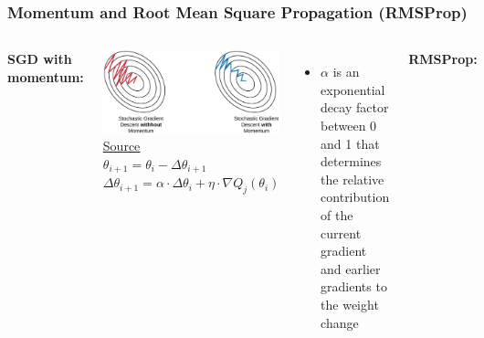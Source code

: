 \documentclass[12pt, aspectratio = 169]{beamer}
\begin{document}

\begin{frame}
	\frametitle{Momentum and Root Mean Square Propagation (RMSProp)}
	\begin{columns}[T]
	    \begin{minipage}[t]{\linewidth}
	        \centering
	        \begin{center}
	            \textbf{SGD with momentum:}
            \end{center}
	        \includegraphics[width=0.6\linewidth]{momentum.png}\\
		    \href{https://eloquentarduino.github.io/2020/04/stochastic-gradient-descent-on-your-microcontroller/}{\color{blue}\uline{Source}}\\
		    $\theta_{i+1} = \theta_i - \Delta \theta_{i+1}$\\
		    $\Delta \theta_{i+1} = \alpha \cdot \Delta \theta_i + \eta \cdot \nabla Q_j(\theta_i)$\\
		    \begin{itemize}
		        \item $\alpha$ is an exponential decay factor between 0 and 1 that determines the relative contribution of the current gradient and earlier gradients to the weight change
		    \end{itemize}
        \end{minipage}
    	\begin{minipage}[t]{\linewidth}
    	    \centering
    	    \begin{center}
	            \textbf{RMSProp:}
            \end{center}
            \includegraphics[width=0.7\linewidth]{rmsprop.png}\\

\end{minipage}
\end{columns}
\end{frame}
\end{document}
